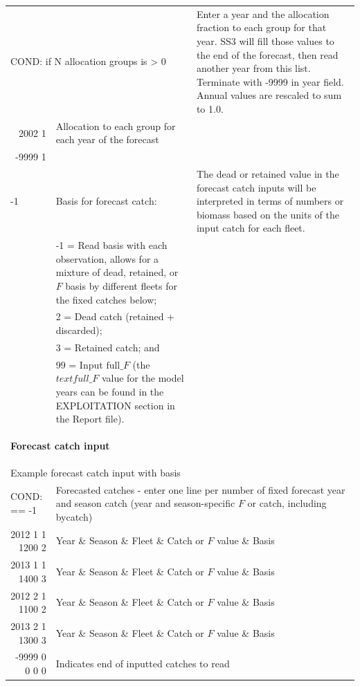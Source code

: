 \begin{landscape}
{\begin{longtable}{p{2cm} p{7cm} p{12cm}}
  \multicolumn{2}{l}{COND: if N allocation groups is > 0} & \multirow{1}{1cm}[-0.25cm]{\parbox{12cm}{Enter a year and the allocation fraction to each group for that year. SS3 will fill those values to the end of the forecast, then read another year from this list. Terminate with -9999 in year field. Annual values are rescaled to sum to 1.0.}} \\
  \multicolumn{1}{r}{2002 1} & Allocation to each group for each year of the forecast & \\
  \multicolumn{1}{r}{-9999 1} & & \Bstrut\\

  \hline
  -1 & Basis for forecast catch: & \multirow{1}{1cm}[-0.25cm]{\parbox{12cm}{The dead or retained value in the forecast catch inputs will be interpreted in terms of numbers or biomass based on the units of the input catch for each fleet.}} \Tstrut\\
    & -1 = Read basis with each observation, allows for a mixture of dead, retained, or $F$ basis by different fleets for the fixed catches below; & \\
    & 2 = Dead catch (retained + discarded); & \\
    & 3 = Retained catch; and & \\
    & 99 = Input $\text{full\_}F$ (the $text{full\_}F$ value for the model years can be found in the EXPLOITATION section in the Report file). & \Bstrut\\
  
  \hline
  \multicolumn{3}{l}{\hypertarget{ForecastCatchInput}{\textbf{Forecast catch input}}} \\
  \multicolumn{3}{l}{Example forecast catch input with basis} \\
  \multicolumn{1}{l}{COND: == -1} & \multicolumn{2}{l}{Forecasted catches - enter one line per number of fixed forecast year and season catch (year and season-specific $F$ or catch, including bycatch)} \Tstrut\\
  \multicolumn{1}{r}{2012 1 1 1200 2} & \multicolumn{2}{l}{Year \& Season \& Fleet \& Catch or $F$ value \& Basis} \\
  \multicolumn{1}{r}{2013 1 1 1400 3} & \multicolumn{2}{l}{Year \& Season \& Fleet \& Catch or $F$ value \& Basis} \\
  \multicolumn{1}{r}{2012 2 1 1100 2} & \multicolumn{2}{l}{Year \& Season \& Fleet \& Catch or $F$ value \& Basis} \\
  \multicolumn{1}{r}{2013 2 1 1300 3} & \multicolumn{2}{l}{Year \& Season \& Fleet \& Catch or $F$ value \& Basis} \\
  \multicolumn{1}{r}{-9999 0 0 0 0} & \multicolumn{2}{l}{Indicates end of inputted catches to read} \Bstrut\\


\end{longtable}}
\end{landscape}
